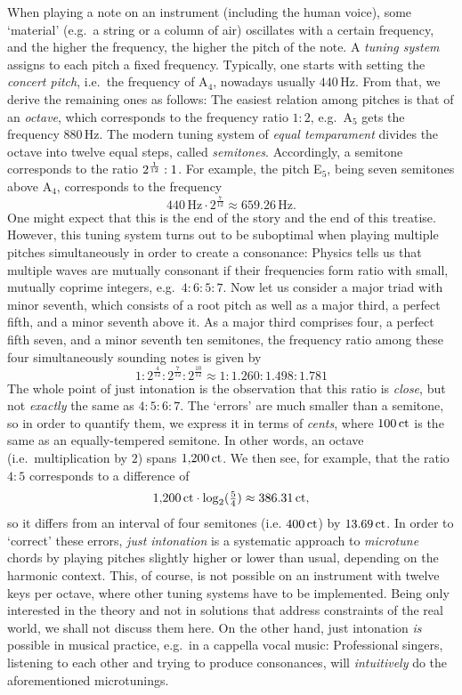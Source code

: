 \documentclass[british,11pt]{scrartcl}
\begin{document}
When playing a note on an instrument (including the human voice), some
‘material’ (e.g.\ a string or a column of air) oscillates with a certain
frequency, and the higher the frequency, the higher the pitch of the note.  A
\emph{tuning system} assigns to each pitch a fixed frequency.  Typically, one
starts with setting the \emph{concert pitch}, i.e.\ the frequency of
A$_4$, nowadays usually $440$\,Hz.  From that, we derive the remaining
ones as follows: The easiest relation among pitches is that of an \emph{octave},
which corresponds to the frequency ratio $1:2$, e.g.\ A$_5$ gets the
frequency $880$\,Hz.  The modern tuning system of \emph{equal temparament}
divides the octave into twelve equal steps, called
\emph{semitones}. Accordingly, a semitone corresponds to the ratio
$2^{\smash{\frac1{12}}}:1$. For example, the pitch E$_5$, being seven
semitones above A$_4$, corresponds to the frequency
\[440\,\text{Hz}\cdot 2^{\frac7{12}} \approx 659.26\,\text{Hz}.\] One might
expect that this is the end of the story and the end of this treatise.  However,
this tuning system turns out to be suboptimal when playing multiple pitches
simultaneously in order to create a consonance: Physics tells us that multiple
waves are mutually consonant if their frequencies form ratio with small, mutually
coprime integers, e.g.\ $4:6:5:7$.  Now let us consider a major triad
with minor seventh, which consists of a root pitch as well as a major third, a
perfect fifth, and a minor seventh above it. As a major third comprises four, a
perfect fifth seven, and a minor seventh ten semitones, the frequency ratio
among these four simultaneously sounding notes is given by
\[1:2^{\frac4{12}}:2^{\frac7{12}}:2^{\frac{10}{12}}\approx
  1:1.260:1.498:1.781\]%
The whole point of just intonation is the observation that this ratio is
\emph{close}, but not \emph{exactly} the same as $4:5:6:7$. The ‘errors’ are
much smaller than a semitone, so in order to quantify them, we express it in
terms of \emph{cents}, where $100\,\mathrm{ct}$ is the same as an equally-tempered
semitone.  In other words, an octave (i.e.\ multiplication by $2$) spans
$1{,}200\,\mathrm{ct}$. We then see, for example, that the ratio $4:5$ corresponds
to a difference of
\[1{,}200\,\mathrm{ct}\cdot \log_2(\tfrac54) \approx 386.31\,\mathrm{ct},\]%
so it differs from an interval of four semitones (i.e. $400\,\mathrm{ct}$) by
$13.69\,\mathrm{ct}$. In order to ‘correct’ these errors, \emph{just intonation} is
a systematic approach to \emph{microtune} chords by playing pitches slightly
higher or lower than usual, depending on the harmonic context. This, of course,
is not possible on an instrument with twelve keys per octave, where other tuning
systems have to be implemented.  Being only interested in the theory and not in
solutions that address constraints of the real world, we shall not discuss them
here.  On the other hand, just intonation \emph{is} possible in musical
practice, e.g.\ in a cappella vocal music: Professional singers, listening to
each other and trying to produce consonances, will \emph{intuitively} do the
aforementioned microtunings.
\end{document}
